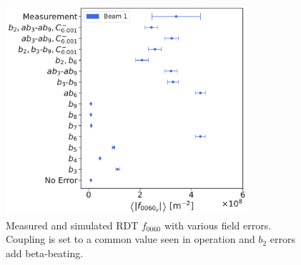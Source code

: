 \begin{figure}[!htb]
    \centering
    \includegraphics[width=0.8\textwidth]{./images/simulations_f0060.pdf}
    \caption{Measured and simulated RDT $f_{0060}$ with various field errors. Coupling is set to a
    common value seen in operation and $b_2$ errors add beta-beating.}
    \label{fig:high_orders:simulations_f0060}
\end{figure}
